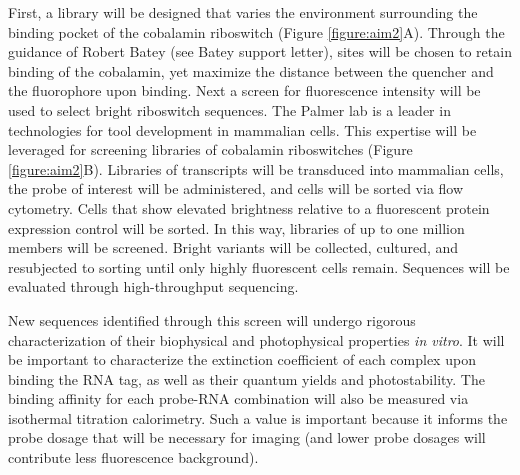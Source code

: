 First, a library will be designed that varies the environment surrounding the binding pocket of the cobalamin riboswitch (Figure \ref{figure:aim2}A). Through the guidance of Robert Batey (see Batey support letter), sites will be chosen to retain binding of the cobalamin, yet maximize the distance between the quencher and the fluorophore upon binding\cite{JohnsonJrB12cofactorsdirectly2012}.
Next a screen for fluorescence intensity will be used to select bright riboswitch sequences.
The Palmer lab is a leader in technologies for tool development in mammalian cells\cite{FiedlerDropletMicrofluidicFlow2017,DeanHighSpeedMultiparameterPhotophysical2015}.
This expertise will be leveraged for screening libraries of cobalamin riboswitches (Figure \ref{figure:aim2}B). Libraries of transcripts will be transduced into mammalian cells, the probe of interest will be administered, and cells will be sorted via flow cytometry.
Cells that show elevated brightness relative to a fluorescent protein expression control will be sorted.
In this way, libraries of up to one million members will be screened. Bright variants will be collected, cultured, and resubjected to sorting until only highly fluorescent cells remain. Sequences will be evaluated through high-throughput sequencing.

New sequences identified through this screen will undergo rigorous characterization of their biophysical and photophysical properties \textit{in vitro}. It will be important to characterize the extinction coefficient of each complex upon binding the RNA tag, as well as their quantum yields and photostability. The binding affinity for each probe-RNA combination will also be measured via isothermal titration calorimetry.
Such a value is important because it informs the probe dosage that will be necessary for imaging (and lower probe dosages will contribute less fluorescence background).

